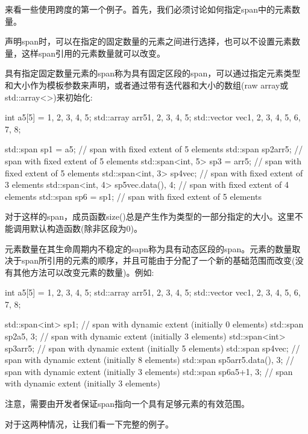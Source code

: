 
来看一些使用跨度的第一个例子。首先，我们必须讨论如何指定span中的元素数量。


声明span时，可以在指定的固定数量的元素之间进行选择，也可以不设置元素数量，这样span引用的元素数量就可以改变。

具有指定固定数量元素的span称为具有固定区段的span，可以通过指定元素类型和大小作为模板参数来声明，或者通过带有迭代器和大小的数组(raw array或std::array<>)来初始化:

\begin{cpp}
int a5[5] = {1, 2, 3, 4, 5};
std::array arr5{1, 2, 3, 4, 5};
std::vector vec{1, 2, 3, 4, 5, 6, 7, 8};

std::span sp1 = a5; // span with fixed extent of 5 elements
std::span sp2{arr5}; // span with fixed extent of 5 elements
std::span<int, 5> sp3 = arr5; // span with fixed extent of 5 elements
std::span<int, 3> sp4{vec}; // span with fixed extent of 3 elements
std::span<int, 4> sp5{vec.data(), 4}; // span with fixed extent of 4 elements
std::span sp6 = sp1; // span with fixed extent of 5 elements
\end{cpp}

对于这样的span，成员函数size()总是产生作为类型的一部分指定的大小。这里不能调用默认构造函数(除非区段为0)。

元素数量在其生命周期内不稳定的sapn称为具有动态区段的span。元素的数量取决于span所引用的元素的顺序，并且可能由于分配了一个新的基础范围而改变(没有其他方法可以改变元素的数量)。例如:

\begin{cpp}
int a5[5] = {1, 2, 3, 4, 5};
std::array arr5{1, 2, 3, 4, 5};
std::vector vec{1, 2, 3, 4, 5, 6, 7, 8};

std::span<int> sp1; // span with dynamic extent (initially 0 elements)
std::span sp2{a5, 3}; // span with dynamic extent (initially 3 elements)
std::span<int> sp3{arr5}; // span with dynamic extent (initially 5 elements)
std::span sp4{vec}; // span with dynamic extent (initially 8 elements)
std::span sp5{arr5.data(), 3}; // span with dynamic extent (initially 3 elements)
std::span sp6{a5+1, 3}; // span with dynamic extent (initially 3 elements)
\end{cpp}

注意，需要由开发者保证span指向一个具有足够元素的有效范围。

对于这两种情况，让我们看一下完整的例子。


